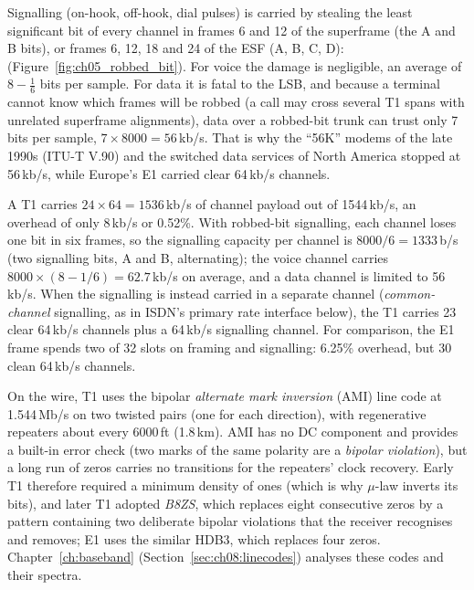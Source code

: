 Signalling (on-hook, off-hook, dial pulses) is carried by stealing the least significant bit of
every channel in frames 6 and 12 of the superframe (the A and B bits), or frames 6, 12, 18 and 24
of the ESF (A, B, C, D):  (Figure~\ref{fig:ch05_robbed_bit}). For voice
the damage is negligible, an average of $8-\frac16$ bits per sample. For data it is fatal to the
LSB, and because a terminal cannot know which frames will be robbed (a call may cross several T1
spans with unrelated superframe alignments), data over a robbed-bit trunk can trust only 7 bits per
sample, $7\times8000=56$\,kb/s. That is why the ``56K'' modems of the late 1990s (ITU-T V.90) and
the switched data services of North America stopped at 56\,kb/s, while Europe's E1 carried clear
64\,kb/s channels.


\begin{worked}
A T1 carries $24\times64=1536$\,kb/s of channel payload out of 1544\,kb/s, an overhead of only
8\,kb/s or 0.52\%. With robbed-bit signalling, each channel loses one bit in six frames, so the
signalling capacity per channel is $8000/6=1333$\,b/s (two signalling bits, A and B, alternating);
the voice channel carries $8000\times(8-1/6)=62.7$\,kb/s on average, and a data channel is
limited to 56\,kb/s. When the signalling is instead carried in a separate channel
(\emph{common-channel} signalling, as in ISDN's primary rate interface below), the T1 carries 23
clear 64\,kb/s channels plus a 64\,kb/s signalling channel. For comparison, the E1 frame spends
two of 32 slots on framing and signalling: 6.25\% overhead, but 30 clean 64\,kb/s channels.
\end{worked}

On the wire, T1 uses the bipolar \emph{alternate mark inversion} (AMI) line code at 1.544\,Mb/s
on two twisted pairs (one for each direction), with regenerative repeaters about every 6000\,ft
(1.8\,km). AMI has no DC component and provides a built-in error check (two marks of the same
polarity are a \emph{bipolar violation}), but a long run of zeros carries no transitions for the
repeaters' clock recovery. Early T1 therefore required a minimum density of ones (which is why
$\mu$-law inverts its bits), and later T1 adopted \emph{B8ZS}, which replaces eight consecutive
zeros by a pattern containing two deliberate bipolar violations that the receiver recognises and
removes; E1 uses the similar HDB3, which replaces four zeros. Chapter~\ref{ch:baseband}
(Section~\ref{sec:ch08:linecodes}) analyses these codes and their spectra.

